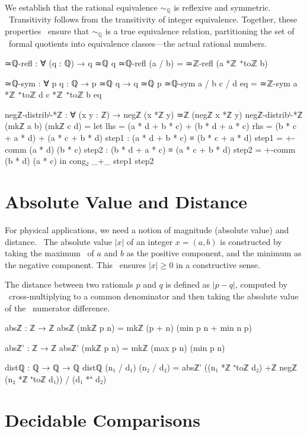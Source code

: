 \documentclass[11pt,a4paper]{book}
\begin{document}
We establish that the rational equivalence $\sim_{\mathbb{Q}}$ is reflexive and symmetric. \
Transitivity follows from the transitivity of integer equivalence. Together, these properties \
ensure that $\sim_{\mathbb{Q}}$ is a true equivalence relation, partitioning the set of \
formal quotients into equivalence classes---the actual rational numbers.

\begin{code}
≃ℚ-refl : ∀ (q : ℚ) → q ≃ℚ q
≃ℚ-refl (a / b) = ≃ℤ-refl (a *ℤ ⁺toℤ b)

≃ℚ-sym : ∀ {p q : ℚ} → p ≃ℚ q → q ≃ℚ p
≃ℚ-sym {a / b} {c / d} eq = ≃ℤ-sym {a *ℤ ⁺toℤ d} {c *ℤ ⁺toℤ b} eq

negℤ-distribˡ-*ℤ : ∀ (x y : ℤ) → negℤ (x *ℤ y) ≃ℤ (negℤ x *ℤ y)
negℤ-distribˡ-*ℤ (mkℤ a b) (mkℤ c d) = 
  let lhs = (a * d + b * c) + (b * d + a * c)
      rhs = (b * c + a * d) + (a * c + b * d)
      step1 : (a * d + b * c) ≡ (b * c + a * d)
      step1 = +-comm (a * d) (b * c)
      step2 : (b * d + a * c) ≡ (a * c + b * d)
      step2 = +-comm (b * d) (a * c)
  in cong₂ _+_ step1 step2
\end{code}

\section{Absolute Value and Distance}

For physical applications, we need a notion of magnitude (absolute value) and distance. \
The absolute value $|x|$ of an integer $x = (a,b)$ is constructed by taking the maximum \
of $a$ and $b$ as the positive component, and the minimum as the negative component. This \
ensures $|x| \ge 0$ in a constructive sense.

The distance between two rationals $p$ and $q$ is defined as $|p - q|$, computed by \
cross-multiplying to a common denominator and then taking the absolute value of the \
numerator difference.

\begin{code}
absℤ : ℤ → ℤ
absℤ (mkℤ p n) = mkℤ (p + n) (min p n + min n p)

absℤ' : ℤ → ℤ
absℤ' (mkℤ p n) = mkℤ (max p n) (min p n)

distℚ : ℚ → ℚ → ℚ
distℚ (n₁ / d₁) (n₂ / d₂) = absℤ' ((n₁ *ℤ ⁺toℤ d₂) +ℤ negℤ (n₂ *ℤ ⁺toℤ d₁)) / (d₁ *⁺ d₂)
\end{code}

\section{Decidable Comparisons}
\end{document}
